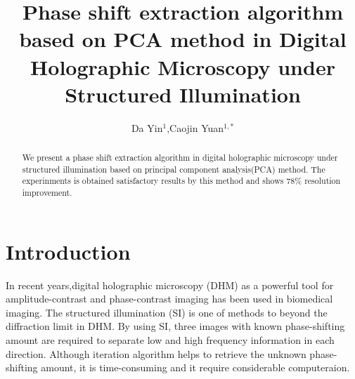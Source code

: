 \documentclass[letterpaper,10pt]{article}
\begin{document}
\title{Phase shift extraction algorithm based on PCA method in Digital Holographic Microscopy under Structured Illumination}

\author{Da Yin$^1$,Caojin Yuan$^{1,*}$}
\address{$^1$Key Laboratory for Opto-Electronic Technology of Jiangsu Province, Nanjing Normal University, Nanjing, 210023, China}



\begin{abstract}
We present a phase shift extraction algorithm in digital holographic microscopy under structured illumination based on principal component analysis(PCA) method.
The experinments is obtained satisfactory results by this method and shows $78\%$ resolution improvement.
\end{abstract}


\section{Introduction}
In recent years,digital holographic microscopy (DHM) as a powerful tool for amplitude-contrast and phase-contrast imaging has been used in biomedical imaging.
The structured illumination (SI) is one of methods to beyond the diffraction limit in DHM\cite{Mico2006}.
By using SI, three images with known phase-shifting amount are required to separate low and high frequency information in each direction. 
Although iteration algorithm helps to retrieve the unknown phase-shifting amount, it is time-consuming and it require considerable computeraion\cite{Zheng2014}.
\end{document}
